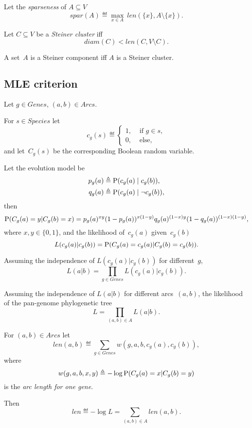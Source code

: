 \documentclass[10pt,a4paper]{article}
\theoremstyle{plain} \newtheorem{Lem}{Lemma}
\begin{document}
Let the {\em sparseness} of $A \subseteq V$
$$ spar(A) \eqdef \max_{x \in A} \ len(\{x\}, A \setminus \{x\}). $$

Let $C \subseteq V$ be a {\em Steiner cluster} iff
$$ diam(C) < len(C, V \setminus C). $$

A set~$A$ is a Steiner component iff $A$ is a Steiner cluster.


\subsection{MLE criterion} \label{MLECriterion}

Let $g \in Genes$,  $(a, b) \in Arcs$.

For $s \in Species$ let
\begin{equation*}
 c_g(s) \eqdef
  \begin{cases}
    1, &\text{ if } g \in s,\\
    0, &\text{ else},
  \end{cases}
\end{equation*}
and let~$C_g(s)$ be the corresponding Boolean random variable.

Let the evolution model be
\begin{equation} \label{pq}
\begin{split}
p_g(a) &\eqdef \P (c_g(a) \mid c_g(b)), \\
q_g(a) &\eqdef \P (c_g(a) \mid \neg c_g(b)),
\end{split}
\end{equation}
then
\begin{equation*}
\P(C_g(a)=y|C_g(b)=x) =  p_g(a)^{x y} (1-p_g(a))^{x (1-y)} q_g(a)^{(1-x) y}(1-q_g(a))^{(1-x)(1-y)},
\end{equation*}
where $x, y \in \{0, 1\}$,
and the likelihood of~$c_g(a)$ given~$c_g(b)$
$$ L(c_g(a)|c_g(b)) = \P(C_g(a)=c_g(a)|C_g(b)=c_g(b)). $$

Assuming the independence of $L(c_g(a)|c_g(b))$ for different~$g$,
$$ L(a|b) = \prod_{g \in Genes} L(c_g(a)|c_g(b)). $$

Assuming the independence of $L(a|b)$ for different arcs~$(a,b)$,
the likelihood of the pan-genome phylogenetic tree
$$ L = \prod_{(a,b) \in A} L(a|b). $$

For $(a,b) \in Arcs$ let
$$ len(a,b) \eqdef \sum_{g \in Genes} w (g,a,b,c_g(a),c_g(b)), $$
where
$$ w (g,a,b,x,y) \eqdef - \log \P(C_g(a)=x|C_g(b)=y) $$
is the {\em arc length for one gene}.

Then
$$ len \eqdef - \log L = \sum_{(a,b) \in A} len(a,b). $$
\end{document}
